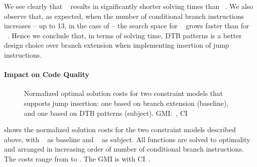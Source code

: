 We see clearly that ~ results
in significantly shorter solving times than ~.
%
We also observe that, as expected, when the number of conditional branch
\glspl{instruction} increases -- up to \num{13}, in the case of
 -- the \gls{search space} for ~ grows faster than for ~.
%
Hence we conclude that, in terms of solving time,
\glspl{DTB pattern} is a better design choice over \gls{branch extension} when
implementing insertion of jump \glspl{instruction}.


\paragraph{Impact on Code Quality}



\begin{figure}
  \centering%
  \maxsizebox{\textwidth}{!}{%
    \trimBarchartPlot{%
    }%
  }

  \caption[%
            Plot comparing optimal solution costs for two constraint models
            supporing jump instruction insertion%
          ]%
          {%
            Normalized optimal solution costs for two constraint models that
            supports jump insertion: one based on branch extension (baseline),
            and one based on DTB patterns (subject).
            GMI:~\printGMI{%
              \DualTargetPatternsVsBranchExtCyclesSpeedupCyclesRegularSpeedupGmean%
            },
            CI~\printGMICI{%
              \DualTargetPatternsVsBranchExtCyclesSpeedupCyclesRegularSpeedupCiMin%
            }{%
              \DualTargetPatternsVsBranchExtCyclesSpeedupCyclesRegularSpeedupCiMax%
            }%
          }
\end{figure}

 shows
the normalized \gls{solution} costs for the two \glspl{constraint model}
described above, with ~ as
\gls{baseline} and ~ as
\gls{subject}.
%
All \glspl{function} are solved to optimality and arranged in increasing order
of number of conditional branch \glspl{instruction}.
%
The costs range from
\printMinCycles{
  \DualTargetPatternsVsBranchExtCyclesSpeedupCyclesAvgMin,
  \DualTargetPatternsVsBranchExtCyclesSpeedupBaselineCyclesAvgMin
} to
\printMaxCycles{
  \DualTargetPatternsVsBranchExtCyclesSpeedupCyclesAvgMax,
  \DualTargetPatternsVsBranchExtCyclesSpeedupBaselineCyclesAvgMax
}.
%
The \gls{GMI} is \printGMI{%
  \DualTargetPatternsVsBranchExtCyclesSpeedupCyclesRegularSpeedupGmean%
} with \gls{CI}~\printGMICI{%
  \DualTargetPatternsVsBranchExtCyclesSpeedupCyclesRegularSpeedupCiMin%
}{%
    \DualTargetPatternsVsBranchExtCyclesSpeedupCyclesRegularSpeedupCiMax%
}.

